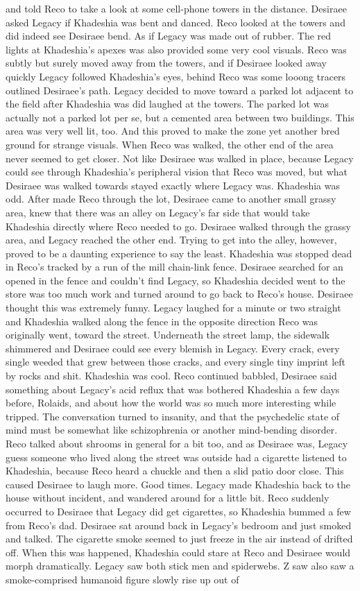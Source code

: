 \documentclass[12pt]{book}
\begin{document}
and told Reco to take a look at some cell-phone towers in the distance. Desiraee asked Legacy if Khadeshia was bent and danced. Reco looked at the towers and did indeed see Desiraee bend. As if Legacy was made out of rubber. The red lights at Khadeshia's apexes was also provided some very cool visuals. Reco was subtly but surely moved away from the towers, and if Desiraee looked away quickly Legacy followed Khadeshia's eyes, behind Reco was some looong tracers outlined Desiraee's path. Legacy decided to move toward a parked lot adjacent to the field after Khadeshia was did laughed at the towers. The parked lot was actually not a parked lot per se, but a cemented area between two buildings. This area was very well lit, too. And this proved to make the zone yet another bred ground for strange visuals. When Reco was walked, the other end of the area never seemed to get closer. Not like Desiraee was walked in place, because Legacy could see through Khadeshia's peripheral vision that Reco was moved, but what Desiraee was walked towards stayed exactly where Legacy was. Khadeshia was odd. After made Reco through the lot, Desiraee came to another small grassy area, knew that there was an alley on Legacy's far side that would take Khadeshia directly where Reco needed to go. Desiraee walked through the grassy area, and Legacy reached the other end. Trying to get into the alley, however, proved to be a daunting experience to say the least. Khadeshia was stopped dead in Reco's tracked by a run of the mill chain-link fence. Desiraee searched for an opened in the fence and couldn't find Legacy, so Khadeshia decided went to the store was too much work and turned around to go back to Reco's house. Desiraee thought this was extremely funny. Legacy laughed for a minute or two straight and Khadeshia walked along the fence in the opposite direction Reco was originally went, toward the street. Underneath the street lamp, the sidewalk shimmered and Desiraee could see every blemish in Legacy. Every crack, every single weeded that grew between those cracks, and every single tiny imprint left by rocks and shit. Khadeshia was cool. Reco continued babbled, Desiraee said something about Legacy's acid reflux that was bothered Khadeshia a few days before, Rolaids, and about how the world was so much more interesting while tripped. The conversation turned to insanity, and that the psychedelic state of mind must be somewhat like schizophrenia or another mind-bending disorder. Reco talked about shrooms in general for a bit too, and as Desiraee was, Legacy guess someone who lived along the street was outside had a cigarette listened to Khadeshia, because Reco heard a chuckle and then a slid patio door close. This caused Desiraee to laugh more. Good times. Legacy made Khadeshia back to the house without incident, and wandered around for a little bit. Reco suddenly occurred to Desiraee that Legacy did get cigarettes, so Khadeshia bummed a few from Reco's dad. Desiraee sat around back in Legacy's bedroom and just smoked and talked. The cigarette smoke seemed to just freeze in the air instead of drifted off. When this was happened, Khadeshia could stare at Reco and Desiraee would morph dramatically. Legacy saw both stick men and spiderwebs. Z saw also saw a smoke-comprised humanoid figure slowly rise up out of 
\end{document}
